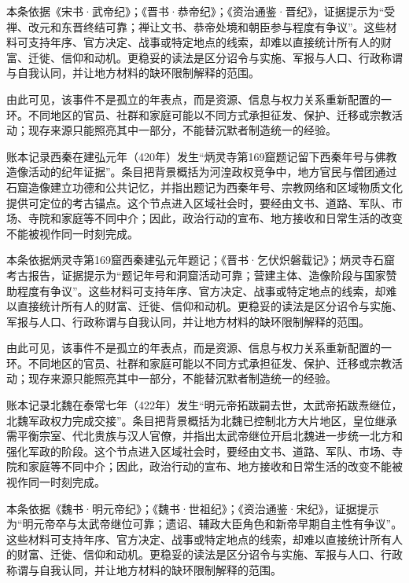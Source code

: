 本条依据《宋书·武帝纪》；《晋书·恭帝纪》；《资治通鉴·晋纪》，证据提示为“受禅、改元和东晋终结可靠；禅让文书、恭帝处境和朝臣参与程度有争议”。这些材料可支持年序、官方决定、战事或特定地点的线索，却难以直接统计所有人的财富、迁徙、信仰和动机。更稳妥的读法是区分诏令与实施、军报与人口、行政称谓与自我认同，并让地方材料的缺环限制解释的范围。

由此可见，该事件不是孤立的年表点，而是资源、信息与权力关系重新配置的一环。不同地区的官员、社群和家庭可能以不同方式承担征发、保护、迁移或宗教活动；现存来源只能照亮其中一部分，不能替沉默者制造统一的经验。

账本记录西秦在建弘元年（420年）发生“炳灵寺第169窟题记留下西秦年号与佛教造像活动的纪年证据”。条目把背景概括为河湟政权竞争中，地方官民与僧团通过石窟造像建立功德和公共记忆，并指出题记为西秦年号、宗教网络和区域物质文化提供可定位的考古锚点。这个节点进入区域社会时，要经由文书、道路、军队、市场、寺院和家庭等不同中介；因此，政治行动的宣布、地方接收和日常生活的改变不能被视作同一时刻完成。

本条依据炳灵寺第169窟西秦建弘元年题记；《晋书·乞伏炽磐载记》；炳灵寺石窟考古报告，证据提示为“题记年号和洞窟活动可靠；营建主体、造像阶段与国家赞助程度有争议”。这些材料可支持年序、官方决定、战事或特定地点的线索，却难以直接统计所有人的财富、迁徙、信仰和动机。更稳妥的读法是区分诏令与实施、军报与人口、行政称谓与自我认同，并让地方材料的缺环限制解释的范围。

由此可见，该事件不是孤立的年表点，而是资源、信息与权力关系重新配置的一环。不同地区的官员、社群和家庭可能以不同方式承担征发、保护、迁移或宗教活动；现存来源只能照亮其中一部分，不能替沉默者制造统一的经验。

账本记录北魏在泰常七年（422年）发生“明元帝拓跋嗣去世，太武帝拓跋焘继位，北魏军政权力完成交接”。条目把背景概括为北魏已控制北方大片地区，皇位继承需平衡宗室、代北贵族与汉人官僚，并指出太武帝继位开启北魏进一步统一北方和强化军政的阶段。这个节点进入区域社会时，要经由文书、道路、军队、市场、寺院和家庭等不同中介；因此，政治行动的宣布、地方接收和日常生活的改变不能被视作同一时刻完成。

本条依据《魏书·明元帝纪》；《魏书·世祖纪》；《资治通鉴·宋纪》，证据提示为“明元帝卒与太武帝继位可靠；遗诏、辅政大臣角色和新帝早期自主性有争议”。这些材料可支持年序、官方决定、战事或特定地点的线索，却难以直接统计所有人的财富、迁徙、信仰和动机。更稳妥的读法是区分诏令与实施、军报与人口、行政称谓与自我认同，并让地方材料的缺环限制解释的范围。

